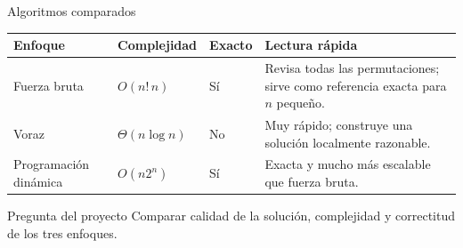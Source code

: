 \documentclass[aspectratio=169]{beamer}
\begin{document}
\begin{frame}{Algoritmos comparados}
  \small
  \begin{table}
    \centering
    \begin{tabularx}{\textwidth}{@{}>{\RaggedRight\arraybackslash}p{2.7cm}>{\Centering\arraybackslash}p{2.6cm}>{\Centering\arraybackslash}p{1.8cm}X@{}}
      \toprule
      Enfoque & Complejidad & Exacto & Lectura r\'apida \\
      \midrule
      Fuerza bruta & \(O(n!\,n)\) & S\'i & Revisa todas las permutaciones; sirve como referencia exacta para \(n\) peque\~no. \\
      Voraz & \(\Theta(n\log n)\) & No & Muy r\'apido; construye una soluci\'on localmente razonable. \\
      Programaci\'on din\'amica & \(O(n2^n)\) & S\'i & Exacta y mucho m\'as escalable que fuerza bruta. \\
      \bottomrule
    \end{tabularx}
  \end{table}

  \vspace{0.4em}
  \begin{block}{Pregunta del proyecto}
    Comparar calidad de la soluci\'on, complejidad y correctitud de los tres enfoques.
  \end{block}
\end{frame}
\end{document}
